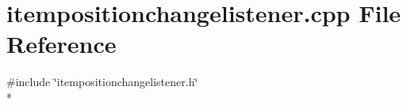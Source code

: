 \section{itempositionchangelistener.\+cpp File Reference}
\label{curve_2itempositionchangelistener_8cpp}
{\ttfamily \#include \char`\"{}itempositionchangelistener.\+h\char`\"{}}\\*
